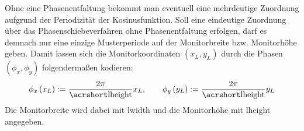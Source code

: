 Ohne eine Phasenentfaltung bekommt man eventuell eine mehrdeutige Zuordnung aufgrund der Periodizität der Kosinusfunktion.
Soll eine eindeutige Zuordnung über das Phasenschiebeverfahren ohne Phasenentfaltung erfolgen, darf es demnach nur eine einzige Musterperiode auf der Monitorbreite bzw. Monitorhöhe geben.
Damit lassen sich die Monitorkoordinaten $(x_{L}, y_{L})$ durch die Phasen $(\phi_{x}, \phi_{y})$ folgendermaßen kodieren:
\begin{equation}\label{eq:phasenkodierung}
	\phi_{x}\left(x_L\right) := \dfrac{2\pi}{\acrshortmath{lheight}}x_{L},
	\qquad
	\phi_{y}\left(y_L\right) := \dfrac{2\pi}{\acrshortmath{lheight}}y_{L}
\end{equation}
%
\noindent
Die Monitorbreite wird dabei mit \acrshort{lwidth} und die Monitorhöhe mit \acrshort{lheight} angegeben.


